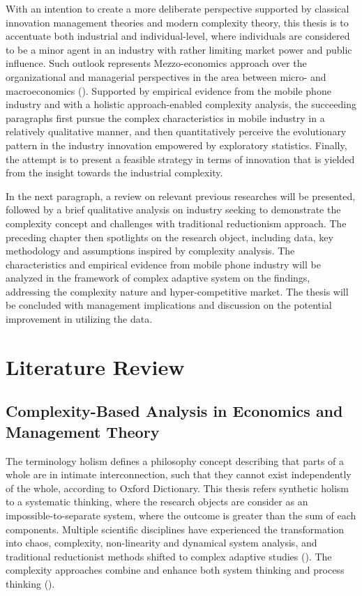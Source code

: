 \documentclass[utf8,english]{gradu3}
\begin{document}
With an intention to create a more deliberate perspective supported by classical innovation management theories and modern complexity theory, this thesis is to accentuate both industrial and individual-level, where individuals are considered to be a minor agent in an industry with rather limiting market power and public influence. Such outlook represents Mezzo-economics approach over the organizational and managerial perspectives in the area between micro- and macroeconomics (\cite{kozuharov2011mezzo}). Supported by empirical evidence from the mobile phone industry and with a holistic approach-enabled complexity analysis, the succeeding paragraphs first pursue the complex characteristics in mobile industry in a relatively qualitative manner, and then quantitatively perceive the evolutionary pattern in the industry innovation empowered by exploratory statistics. Finally, the attempt is to present a feasible strategy in terms of innovation that is yielded from the insight towards the industrial complexity. 

In the next paragraph, a review on relevant previous researches will be presented, followed by a brief qualitative analysis on industry seeking to demonstrate the complexity concept and challenges with traditional reductionism approach. The preceding chapter then spotlights on the research object, including data, key methodology and assumptions inspired by complexity analysis. The characteristics and empirical evidence from mobile phone industry will be analyzed in the framework of complex adaptive system on the findings, addressing the complexity nature and hyper-competitive market. The thesis will be concluded with management implications and discussion on the potential improvement in utilizing the data.

\chapter{Literature Review}

\section{Complexity-Based Analysis in Economics and Management Theory}

The terminology holism defines a philosophy concept describing that parts of a whole are in intimate interconnection, such that they cannot exist independently of the whole, according to Oxford Dictionary. This thesis refers synthetic holism to a systematic thinking, where the research objects are consider as an impossible-to-separate system, where the outcome is greater than the sum of each components. Multiple scientific disciplines have experienced the transformation into chaos, complexity, non-linearity and dynamical system analysis, and traditional reductionist methods shifted to complex adaptive studies (\cite{urry2005complexity}). The complexity approaches combine and enhance both system thinking and process thinking (\cite{thrift1999place}). 
\end{document}
